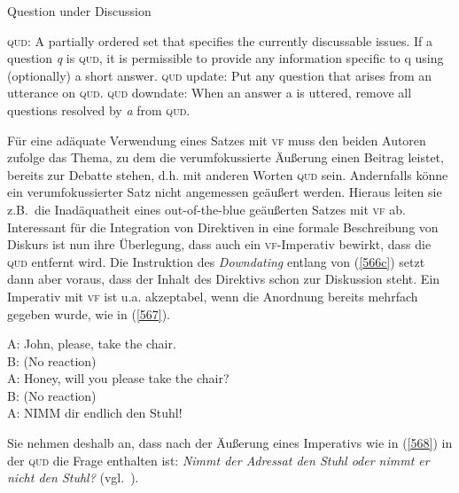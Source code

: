 \begin{exe}
	\ex\label{566} Question under Discussion 
		\begin{xlist}	
			\ex\label{566a} \textsc{qud}: A partially ordered set that specifies the currently discussable issues. If
	 		a question \textit{q} is \textsc{qud}, it is permissible to provide any information specific to q using (optionally) 			a short answer.
			\ex\label{566b} \textsc{qud} update: Put any question that arises from an utterance on \textsc{qud}.
			\ex\label{566c} \textsc{qud} downdate: When an answer a is uttered, remove all questions resolved by \textit{a} from 			\textsc{qud}.	
			\hfill\hbox{\citet[95]{Engdahl2006}}
		\end{xlist}
\end{exe}
Für eine adäquate Verwendung eines Satzes mit \textsc{vf} muss den beiden Autoren zufolge das Thema, zu dem die verumfokussierte Äußerung einen Beitrag leistet, bereits zur Debatte stehen, d.h. mit anderen Worten \textsc{qud} sein. Andernfalls könne ein verumfokussierter Satz nicht angemessen geäußert werden. Hieraus leiten sie z.B.\ die Inadäquatheit eines out-of-the-blue geäußerten Satzes mit \textsc{vf} ab. Interessant für die Integration von Direktiven in eine formale Beschreibung von Diskurs ist nun ihre Überlegung, dass auch ein \textsc{vf}-Imperativ bewirkt, dass die \textsc{qud} entfernt wird. Die Instruktion des \textit{Downdating} entlang von (\ref{566c}) setzt dann aber voraus, dass der Inhalt des Direktivs schon zur Diskussion steht. Ein Impe\-rativ mit \textsc{vf} ist u.a. akzeptabel, wenn die Anordnung bereits mehrfach gegeben wurde, wie in (\ref{567}).

\begin{exe}
	\ex\label{567}  
	A: John, please, take the chair.\\
	B: (No reaction)\\
	A: Honey, will you please take the chair?\\
	B: (No reaction)\\
	A: NIMM dir endlich den Stuhl!
\hfill\hbox{\citet[163]{Gutzmann2011}}
\end{exe}

Sie nehmen deshalb an, dass nach der Äußerung eines Imperativs  wie in (\ref{568}) in der \textsc{qud} die Frage enthalten ist: \textit{Nimmt der Adressat den Stuhl oder nimmt er nicht den Stuhl?} (vgl.\ \citealt[163]{Gutzmann2011}).

